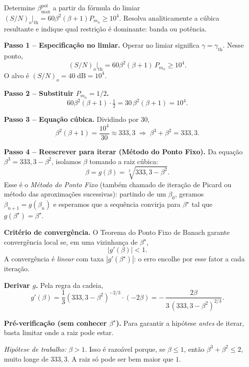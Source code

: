 \documentclass[11pt,a4paper]{article}
\begin{document}
\begin{enunciado}[Item b)]
Determine $\beta_{\max}^{\text{pot}}$ a partir da fórmula do limiar $(S/N)_o\big|_{\text{th}} = 60\beta^2(\beta+1)P_{m_n} \ge 10^4$. Resolva analiticamente a cúbica resultante e indique qual restrição é dominante: banda ou potência.
\end{enunciado}

\begin{resolucao}

\textbf{Passo 1 -- Especificação no limiar.} Operar no limiar significa $\gamma = \gamma_{\text{th}}$. Nesse ponto,
\[
  (S/N)_o\big|_{\text{th}} = 60\beta^2(\beta+1)\,P_{m_n} \ge 10^4.
\]
O alvo é $(S/N)_o = 40\;\text{dB} = 10^4$.

\textbf{Passo 2 -- Substituir $P_{m_n} = 1/2$.}
\[
  60\beta^2(\beta+1)\cdot\tfrac{1}{2} = 30\,\beta^2(\beta+1) = 10^4.
\]

\textbf{Passo 3 -- Equação cúbica.} Dividindo por $30$,
\[
  \beta^2(\beta+1) = \frac{10^4}{30} \approx 333{,}3 \;\Rightarrow\; \beta^3 + \beta^2 = 333{,}3.
\]

\textbf{Passo 4 -- Reescrever para iterar (Método do Ponto Fixo).} Da equação $\beta^3 = 333{,}3 - \beta^2$, isolamos $\beta$ tomando a raiz cúbica:
\[
  \beta = g(\beta) = \sqrt[3]{333{,}3 - \beta^2}.
\]
Esse é o \emph{Método do Ponto Fixo} (também chamado de iteração de Picard ou método das aproximações sucessivas): partindo de um $\beta_0$, geramos $\beta_{n+1} = g(\beta_n)$ e esperamos que a sequência convirja para $\beta^\star$ tal que $g(\beta^\star) = \beta^\star$.

\textbf{Critério de convergência.} O Teorema do Ponto Fixo de Banach garante convergência local se, em uma vizinhança de $\beta^\star$,
\[
  |g'(\beta)| < 1.
\]
A convergência é \emph{linear} com taxa $|g'(\beta^\star)|$: o erro encolhe por esse fator a cada iteração.

\textbf{Derivar $g$.} Pela regra da cadeia,
\[
  g'(\beta) = \frac{1}{3}(333{,}3 - \beta^2)^{-2/3}\cdot(-2\beta)
            = -\,\frac{2\beta}{3\,(333{,}3 - \beta^2)^{2/3}}.
\]

\textbf{Pré-verificação (sem conhecer $\beta^\star$).} Para garantir a hipótese \emph{antes} de iterar, basta limitar onde a raiz pode estar.

\emph{Hipótese de trabalho:} $\beta > 1$. Isso é razoável porque, se $\beta \le 1$, então $\beta^3 + \beta^2 \le 2$, muito longe de $333{,}3$. A raiz só pode ser bem maior que $1$.


\end{resolucao}
\end{document}
